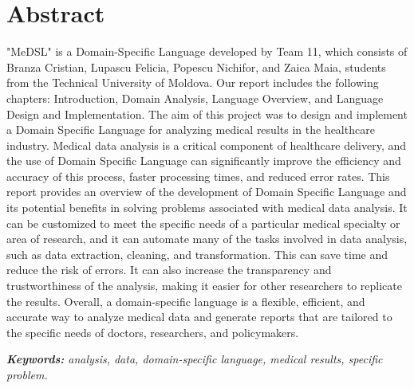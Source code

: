 \chapter*{Abstract}

"MeDSL" is a Domain-Specific Language developed by Team 11, which consists of Branza Cristian, Lupascu Felicia, Popescu Nichifor, and Zaica Maia, students from the Technical University of Moldova.
Our report includes the following chapters: Introduction, Domain Analysis, Language Overview, and Language Design and Implementation.
The aim of this project was to design and implement a Domain Specific Language for analyzing medical results in the healthcare industry. Medical data analysis is a critical component of healthcare delivery, and the use of Domain Specific Language can significantly improve the efficiency and accuracy of this process,  faster processing times, and reduced error rates. This report provides an overview of the development of Domain Specific Language and its potential benefits in solving problems associated with medical data analysis.
It can be customized to meet the specific needs of a particular medical specialty or area of research, and it can automate many of the tasks involved in data analysis, such as data extraction, cleaning, and transformation. This can save time and reduce the risk of errors. It can also increase the transparency and trustworthiness of the analysis, making it easier for other researchers to replicate the results. Overall, a domain-specific language is a flexible, efficient, and accurate way to analyze medical data and generate reports that are tailored to the specific needs of doctors, researchers, and policymakers.

\vspace{0.5cm}

\emph{\textbf{Keywords: } analysis, data, domain-specific language, medical results, specific problem.}

